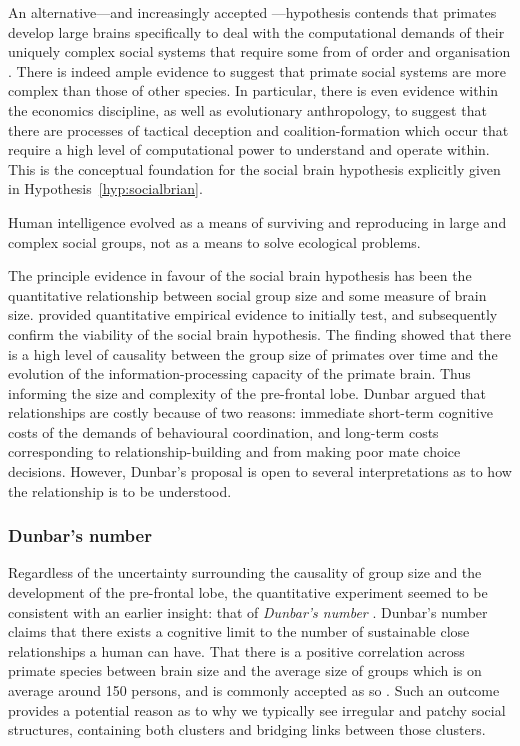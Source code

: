 An alternative---and increasingly accepted \citep{Dunbar2009}---hypothesis contends that primates develop large brains specifically to deal with the computational demands of their uniquely complex social systems that require some from of order and organisation \citep{WhitenByrne1988}. There is indeed ample evidence to suggest that primate social systems are more complex than those of other species. In particular, there is even evidence within the economics discipline, as well as evolutionary anthropology, to suggest that there are processes of tactical deception and coalition-formation which occur that require a high level of computational power to understand and operate within. This is the conceptual foundation for the social brain hypothesis explicitly given in Hypothesis~\ref{hyp:socialbrian}.

\begin{hypothesis} \label{hyp:socialbrian}
Human intelligence evolved as a means of surviving and reproducing in large and complex social groups, not as a means to solve ecological problems.
\end{hypothesis}

The principle evidence in favour of the social brain hypothesis has been the quantitative relationship between social group size and some measure of brain size. \citet{Dunbar1998} provided quantitative empirical evidence to initially test, and subsequently confirm the viability of the social brain hypothesis. The finding showed that there is a high level of causality between the group size of primates over time and the evolution of the information-processing capacity of the primate brain. Thus informing the size and complexity of the pre-frontal lobe. Dunbar argued that relationships are costly because of two reasons: immediate short-term cognitive costs of the demands of behavioural coordination, and long-term costs corresponding to relationship-building and from making poor mate choice decisions. However, Dunbar's proposal is open to several interpretations as to how the relationship is to be understood.

\subsubsection{Dunbar's number}

Regardless of the uncertainty surrounding the causality of group size and the development of the pre-frontal lobe, the quantitative experiment seemed to be consistent with an earlier insight: that of \textit{Dunbar's number}  \citet{Dunbar1992}. Dunbar's number claims that there exists a cognitive limit to the number of sustainable close relationships a human can have. That there is a positive correlation across primate species between brain size and the average size of groups which is on average around 150 persons, and is commonly accepted as so \citep{Hernando2010}. Such an outcome provides a potential reason as to why we typically see irregular and patchy social structures, containing both clusters and bridging links between those clusters.

